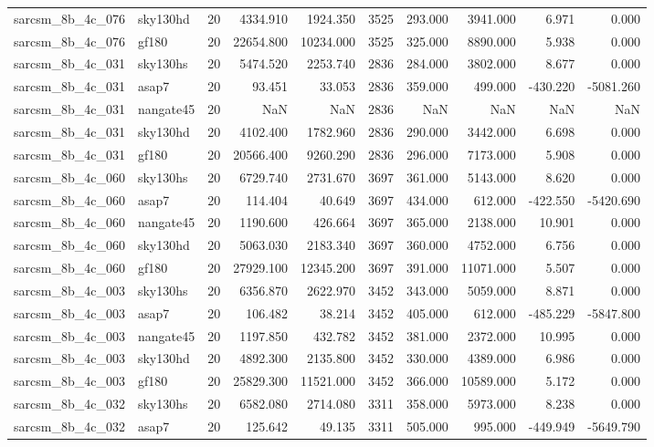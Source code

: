 \documentclass{article}
\begin{document}
\begin{longtable}{llrrrrrrrr}
sarcsm\_8b\_4c\_076 & sky130hd & 20 & 4334.910 & 1924.350 & 3525 & 293.000 & 3941.000 & 6.971 & 0.000 \\
sarcsm\_8b\_4c\_076 & gf180 & 20 & 22654.800 & 10234.000 & 3525 & 325.000 & 8890.000 & 5.938 & 0.000 \\
sarcsm\_8b\_4c\_031 & sky130hs & 20 & 5474.520 & 2253.740 & 2836 & 284.000 & 3802.000 & 8.677 & 0.000 \\
sarcsm\_8b\_4c\_031 & asap7 & 20 & 93.451 & 33.053 & 2836 & 359.000 & 499.000 & -430.220 & -5081.260 \\
sarcsm\_8b\_4c\_031 & nangate45 & 20 & NaN & NaN & 2836 & NaN & NaN & NaN & NaN \\
sarcsm\_8b\_4c\_031 & sky130hd & 20 & 4102.400 & 1782.960 & 2836 & 290.000 & 3442.000 & 6.698 & 0.000 \\
sarcsm\_8b\_4c\_031 & gf180 & 20 & 20566.400 & 9260.290 & 2836 & 296.000 & 7173.000 & 5.908 & 0.000 \\
sarcsm\_8b\_4c\_060 & sky130hs & 20 & 6729.740 & 2731.670 & 3697 & 361.000 & 5143.000 & 8.620 & 0.000 \\
sarcsm\_8b\_4c\_060 & asap7 & 20 & 114.404 & 40.649 & 3697 & 434.000 & 612.000 & -422.550 & -5420.690 \\
sarcsm\_8b\_4c\_060 & nangate45 & 20 & 1190.600 & 426.664 & 3697 & 365.000 & 2138.000 & 10.901 & 0.000 \\
sarcsm\_8b\_4c\_060 & sky130hd & 20 & 5063.030 & 2183.340 & 3697 & 360.000 & 4752.000 & 6.756 & 0.000 \\
sarcsm\_8b\_4c\_060 & gf180 & 20 & 27929.100 & 12345.200 & 3697 & 391.000 & 11071.000 & 5.507 & 0.000 \\
sarcsm\_8b\_4c\_003 & sky130hs & 20 & 6356.870 & 2622.970 & 3452 & 343.000 & 5059.000 & 8.871 & 0.000 \\
sarcsm\_8b\_4c\_003 & asap7 & 20 & 106.482 & 38.214 & 3452 & 405.000 & 612.000 & -485.229 & -5847.800 \\
sarcsm\_8b\_4c\_003 & nangate45 & 20 & 1197.850 & 432.782 & 3452 & 381.000 & 2372.000 & 10.995 & 0.000 \\
sarcsm\_8b\_4c\_003 & sky130hd & 20 & 4892.300 & 2135.800 & 3452 & 330.000 & 4389.000 & 6.986 & 0.000 \\
sarcsm\_8b\_4c\_003 & gf180 & 20 & 25829.300 & 11521.000 & 3452 & 366.000 & 10589.000 & 5.172 & 0.000 \\
sarcsm\_8b\_4c\_032 & sky130hs & 20 & 6582.080 & 2714.080 & 3311 & 358.000 & 5973.000 & 8.238 & 0.000 \\
sarcsm\_8b\_4c\_032 & asap7 & 20 & 125.642 & 49.135 & 3311 & 505.000 & 995.000 & -449.949 & -5649.790 \\

\end{longtable}
\end{document}
